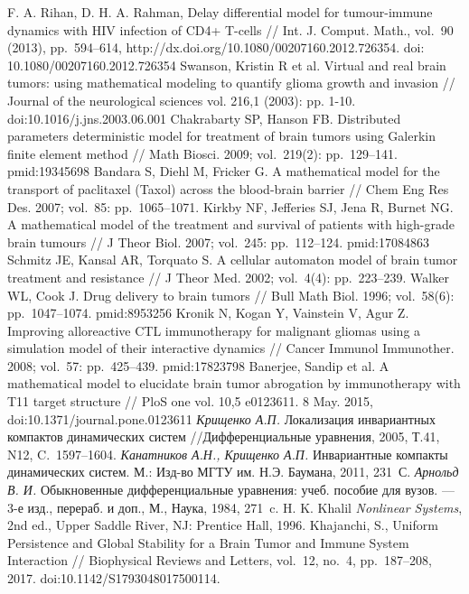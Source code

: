 \documentclass[14pt,a4paper]{extarticle}
\begin{document}
\begin{thebibliography}{\kern\bibindent}
		F. A. Rihan, D. H. A. Rahman, Delay differential model for tumour-immune dynamics with HIV infection of CD4+ T-cells // Int. J. Comput. Math., vol.~90 (2013), pp.~594–614, http://dx.doi.org/10.1080/00207160.2012.726354. doi: 10.1080/00207160.2012.726354 
		Swanson, Kristin R et al. Virtual and real brain tumors: using mathematical modeling to quantify glioma growth and invasion // Journal of the neurological sciences vol. 216,1 (2003): pp. 1-10. doi:10.1016/j.jns.2003.06.001
		Chakrabarty SP, Hanson FB. Distributed parameters deterministic model for treatment of brain tumors using Galerkin finite element method // Math Biosci. 2009; vol.~219(2): pp.~129–141. pmid:19345698
		Bandara S, Diehl M, Fricker G. A mathematical model for the transport of paclitaxel (Taxol) across the blood-brain barrier // Chem Eng Res Des. 2007; vol.~85: pp.~1065–1071.
		Kirkby NF, Jefferies SJ, Jena R, Burnet NG. A mathematical model of the treatment and survival of patients with high-grade brain tumours // J Theor Biol. 2007; vol.~245: pp.~112–124. pmid:17084863
		Schmitz JE, Kansal AR, Torquato S. A cellular automaton model of brain tumor treatment and resistance // J Theor Med. 2002; vol.~4(4): pp.~223–239.
		Walker WL, Cook J. Drug delivery to brain tumors // Bull Math Biol. 1996; vol.~58(6): pp.~1047–1074. pmid:8953256
		Kronik N, Kogan Y, Vainstein V, Agur Z. Improving alloreactive CTL immunotherapy for malignant gliomas using a simulation model of their interactive dynamics // Cancer Immunol Immunother. 2008; vol.~57: pp.~425–439. pmid:17823798
		Banerjee, Sandip et al. A mathematical model to elucidate brain tumor abrogation by immunotherapy with T11 target structure // PloS one vol. 10,5 e0123611. 8 May. 2015, doi:10.1371/journal.pone.0123611
		\textit{Крищенко А.П.} Локализация инвариантных компактов динамических систем //Дифференциальные уравнения, 2005, Т.41, N12, C.~1597--1604.
		\textit{Канатников А.Н., Крищенко А.П.} Инвариантные компакты динамических систем. М.: Изд-во МГТУ им. Н.Э. Баумана, 2011, 231~С.
		\textit{Арнольд В. И.} Обыкновенные дифференциальные уравнения: учеб. пособие для вузов. --- 3-е изд., перераб. и доп., М., Наука, 1984, 271~c.
		H. K. Khalil \textit{Nonlinear Systems}, 2nd ed., Upper Saddle River, NJ: Prentice Hall, 1996.
		Khajanchi, S., Uniform Persistence and Global Stability for a Brain Tumor and Immune System Interaction // Biophysical Reviews and Letters, vol.~12, no.~4, pp.~187–208, 2017. doi:10.1142/S1793048017500114.
	\end{thebibliography}
	
\end{document}
